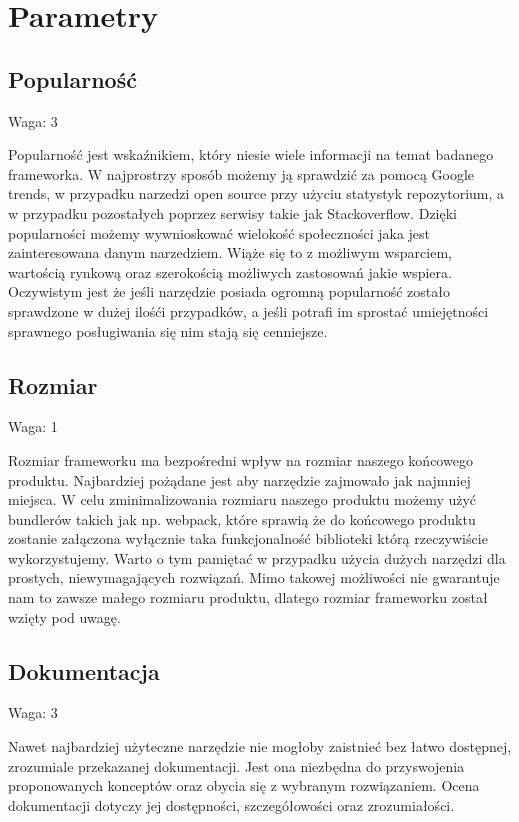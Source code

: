 \documentclass[12pt]{report}
\begin{document}
  \section{Parametry}

    \subsection{Popularność}
      \begin{description}
        \item Waga: 3
      \end{description}
      Popularność jest wskaźnikiem, który niesie wiele informacji na temat badanego frameworka.
      W najprostrzy sposób możemy ją sprawdzić za pomocą Google trends, w przypadku narzedzi open source przy użyciu statystyk repozytorium, a w przypadku pozostałych poprzez serwisy takie jak Stackoverflow.
      Dzięki popularności możemy wywnioskować wielokość społeczności jaka jest zainteresowana danym narzedziem.
      Wiąże się to z możliwym wsparciem, wartością rynkową oraz szerokością możliwych zastosowań jakie wspiera.
      Oczywistym jest że jeśli narzędzie posiada ogromną popularność zostało sprawdzone w dużej ilośći przypadków, a jeśli potrafi im sprostać umiejętności sprawnego posługiwania się nim stają się cenniejsze.

    \subsection{Rozmiar}
      \begin{description}
        \item Waga: 1
      \end{description}
      Rozmiar frameworku ma bezpośredni wpływ na rozmiar naszego końcowego produktu.
      Najbardziej pożądane jest aby narzędzie zajmowało jak najmniej miejsca.
      W celu zminimalizowania rozmiaru naszego produktu możemy użyć bundlerów takich jak np. webpack, które sprawią że do końcowego produktu zostanie załączona wyłącznie taka funkcjonalność biblioteki którą rzeczywiście wykorzystujemy.
      Warto o tym pamiętać w przypadku użycia dużych narzędzi dla prostych, niewymagających rozwiązań.
      Mimo takowej możliwości nie gwarantuje nam to zawsze małego rozmiaru produktu, dlatego rozmiar frameworku został wzięty pod uwagę.

    \subsection{Dokumentacja}
      \begin{description}
        \item Waga: 3
      \end{description}
      Nawet najbardziej użyteczne narzędzie nie mogłoby zaistnieć bez łatwo dostępnej, zrozumiale przekazanej dokumentacji.
      Jest ona niezbędna do przyswojenia proponowanych konceptów oraz obycia się z wybranym rozwiązaniem.
      Ocena dokumentacji dotyczy jej dostępności, szczegółowości oraz zrozumiałości.
\end{document}
